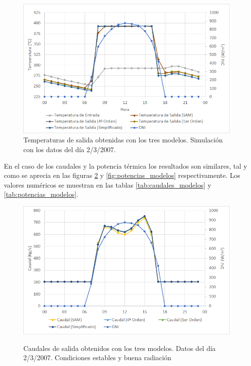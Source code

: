 \begin{figure}[H]
\includegraphics[width=0.9\linewidth]{images/temperaturas_modelos.png}
\caption[Temperaturas de salida obtenidas con los tres modelos]{Temperaturas de salida obtenidas con los tres modelos. Simulación con los datos del día 2/3/2007.} 
\label{fig:temperaturas_modelos}
\end{figure}

En el caso de los caudales y la potencia térmica  los resultados son similares, tal y como se aprecia en las figuras \ref{fig:caudales_modelos} y \ref{fig:potencias_modelos} respectivamente. Los valores numéricos se muestran en las tablas \ref{tab:caudales_modelos} y  \ref{tab:potencias_modelos}.

\begin{figure}[H]
\caption[Caudales de salida obtenidos con los tres modelos en un día de condiciones estables]{Caudales de salida obtenidos con los tres modelos. Datos del día 2/3/2007. Condiciones estables y buena radiación} 
\includegraphics[width=0.9\linewidth]{images/caudales_modelos.png}
\label{fig:caudales_modelos}
\end{figure}

